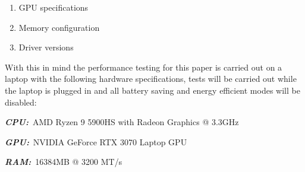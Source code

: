 \begin{enumerate}
    \item GPU specifications
    \item Memory configuration
    \item Driver versions
\end{enumerate}

With this in mind the performance testing for this paper is carried out on a laptop with the following hardware
specifications, tests will be carried out while the laptop is plugged in and all battery saving and energy efficient
modes will be disabled:

\begin{description}
    \item \textbf{\textit{CPU:}}~AMD Ryzen 9 5900HS with Radeon Graphics @ 3.3GHz
    \item \textbf{\textit{GPU:}}~NVIDIA GeForce RTX 3070 Laptop GPU
    \item \textbf{\textit{RAM:}}~16384MB @ 3200 MT/s
\end{description}
